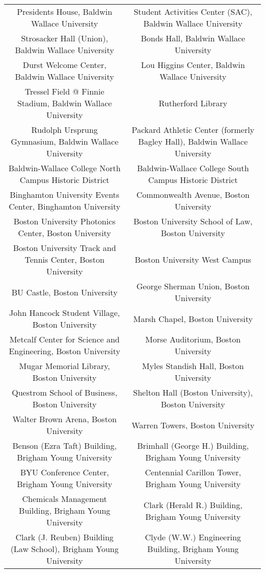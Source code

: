 \documentclass[sigconf]{acmart}
\begin{document}
\begin{table*}
\begin{center}
\begin{tabular}{c|c}
Presidents House, Baldwin Wallace University & Student Activities Center (SAC), Baldwin Wallace University\\
Strosacker Hall (Union), Baldwin Wallace University & Bonds Hall, Baldwin Wallace University\\
Durst Welcome Center, Baldwin Wallace University & Lou Higgins Center, Baldwin Wallace University\\
Tressel Field @ Finnie Stadium, Baldwin Wallace University & Rutherford Library\\
Rudolph Ursprung Gymnasium, Baldwin Wallace University & Packard Athletic Center (formerly Bagley Hall), Baldwin Wallace University\\
Baldwin-Wallace College North Campus Historic District & Baldwin-Wallace College South Campus Historic District\\
Binghamton University Events Center, Binghamton University & Commonwealth Avenue, Boston University\\
Boston University Photonics Center, Boston University & Boston University School of Law, Boston University\\
Boston University Track and Tennis Center, Boston University & Boston University West Campus\\
BU Castle, Boston University & George Sherman Union, Boston University\\
John Hancock Student Village, Boston University & Marsh Chapel, Boston University\\
Metcalf Center for Science and Engineering, Boston University & Morse Auditorium, Boston University\\
Mugar Memorial Library, Boston University & Myles Standish Hall, Boston University\\
Questrom School of Business, Boston University & Shelton Hall (Boston University), Boston University\\
Walter Brown Arena, Boston University & Warren Towers, Boston University\\
Benson (Ezra Taft) Building, Brigham Young University & Brimhall (George H.) Building, Brigham Young University\\
BYU Conference Center, Brigham Young University & Centennial Carillon Tower, Brigham Young University\\
Chemicals Management Building, Brigham Young University & Clark (Herald R.) Building, Brigham Young University\\
Clark (J. Reuben) Building (Law School), Brigham Young University & Clyde (W.W.) Engineering Building, Brigham Young University\\

\end{tabular}
\end{center}
\end{table*}
\end{document}
